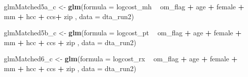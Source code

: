 \documentclass[]{article}
\newenvironment{Shaded}{\begin{snugshade}}{\end{snugshade}}
\newcommand{\KeywordTok}[1]{\textcolor[rgb]{0.13,0.29,0.53}{\textbf{#1}}}
\newcommand{\DataTypeTok}[1]{\textcolor[rgb]{0.13,0.29,0.53}{#1}}
\newcommand{\StringTok}[1]{\textcolor[rgb]{0.31,0.60,0.02}{#1}}
\newcommand{\OperatorTok}[1]{\textcolor[rgb]{0.81,0.36,0.00}{\textbf{#1}}}
\newcommand{\NormalTok}[1]{#1}
\begin{document}
\begin{Shaded}
\begin{Highlighting}[]
\NormalTok{glmMatched5a_c <-}\StringTok{ }\KeywordTok{glm}\NormalTok{(}\DataTypeTok{formula =}\NormalTok{ logcost_mh }\OperatorTok{~}\StringTok{ }\NormalTok{om_flag }\OperatorTok{+}\StringTok{ }\NormalTok{age }\OperatorTok{+}\StringTok{ }\NormalTok{female }\OperatorTok{+}\StringTok{ }\NormalTok{mm }\OperatorTok{+}\StringTok{ }\NormalTok{hcc }\OperatorTok{+}\StringTok{ }\NormalTok{ccs}\OperatorTok{+}\StringTok{ }\NormalTok{zip  ,}
                    \DataTypeTok{data    =}\NormalTok{ dta_run2)}


\NormalTok{glmMatched5b_c <-}\StringTok{ }\KeywordTok{glm}\NormalTok{(}\DataTypeTok{formula =}\NormalTok{ logcost_pt }\OperatorTok{~}\StringTok{ }\NormalTok{om_flag }\OperatorTok{+}\StringTok{ }\NormalTok{age }\OperatorTok{+}\StringTok{ }\NormalTok{female }\OperatorTok{+}\StringTok{ }\NormalTok{mm }\OperatorTok{+}\StringTok{ }\NormalTok{hcc }\OperatorTok{+}\StringTok{ }\NormalTok{ccs }\OperatorTok{+}\StringTok{ }\NormalTok{zip ,}
                    \DataTypeTok{data    =}\NormalTok{ dta_run2)}


\NormalTok{glmMatched6_c <-}\StringTok{ }\KeywordTok{glm}\NormalTok{(}\DataTypeTok{formula =}\NormalTok{ logcost_rx }\OperatorTok{~}\StringTok{ }\NormalTok{om_flag }\OperatorTok{+}\StringTok{ }\NormalTok{age }\OperatorTok{+}\StringTok{ }\NormalTok{female }\OperatorTok{+}\StringTok{ }\NormalTok{mm }\OperatorTok{+}\StringTok{ }\NormalTok{hcc }\OperatorTok{+}\StringTok{ }\NormalTok{ccs }\OperatorTok{+}\StringTok{ }\NormalTok{zip ,}
                   \DataTypeTok{data    =}\NormalTok{ dta_run2)}



\end{Highlighting}
\end{Shaded}
\end{document}
